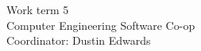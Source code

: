 
\begin{titlepage}
 \maketitle
 \thispagestyle{empty} %
 \centering
 \large
 \vspace{1cm}
 Work term 5\\
 \vspace{1cm}
 Computer Engineering Software Co-op \\
 \vspace{1cm}
 Coordinator: Dustin Edwards
\end{titlepage}
